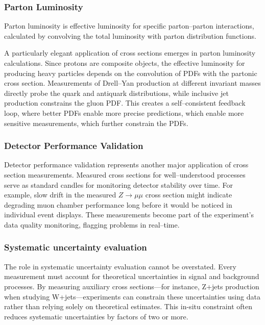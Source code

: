 \begin{definition}
        \subsubsection{Parton Luminosity}
            Parton luminosity is effective luminosity for specific parton--parton interactions, calculated by convolving the total luminosity with parton distribution functions.

            A particularly elegant application of cross sections emerges in parton luminosity calculations.
            Since protons are composite objects, the effective luminosity for producing heavy particles depends on the convolution of PDFs with the partonic cross section.
            Measurements of Drell--Yan production at different invariant masses directly probe the quark and antiquark distributions, while inclusive jet production constrains the gluon PDF.
            This creates a self--consistent feedback loop, where better PDFs enable more precise predictions, which enable more sensitive measurements, which further constrain the PDFs.
            
        \subsubsection{Detector Performance Validation}
             Detector performance validation represents another major application of cross section measurements.
             Measured cross sections for well--understood processes serve as standard candles for monitoring detector stability over time.
             For example, slow drift in the measured \(Z\to\mu\mu\) cross section might indicate degrading muon chamber performance long before it would be noticed in individual event displays.
             These measurements become part of the experiment's data quality monitoring, flagging problems in real--time.
            \subsubsection{Systematic uncertainty evaluation}
                The role in systematic uncertainty evaluation cannot be overstated. Every measurement must account for theoretical uncertainties in signal and background processes. By measuring auxiliary cross sections—for instance, Z+jets production when studying W+jets—experiments can constrain these uncertainties using data rather than relying solely on theoretical estimates. This in-situ constraint often reduces systematic uncertainties by factors of two or more.

\end{definition}
